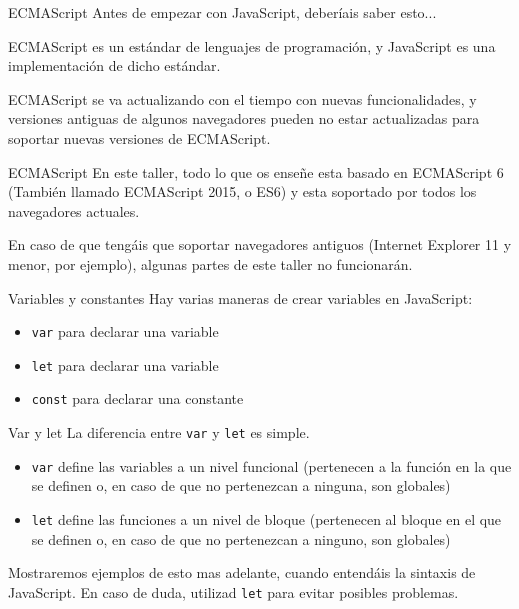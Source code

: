\documentclass{beamer}
\begin{document}
\begin{frame}{ECMAScript}
Antes de empezar con JavaScript, deberíais saber esto...

ECMAScript es un estándar de lenguajes de programación, y JavaScript es una implementación de dicho estándar. \pause

ECMAScript se va actualizando con el tiempo con nuevas funcionalidades, y versiones antiguas de algunos navegadores pueden no estar actualizadas para soportar nuevas versiones de ECMAScript.
\end{frame}

\begin{frame}{ECMAScript}
En este taller, todo lo que os enseñe esta basado en ECMAScript 6 (También llamado ECMAScript 2015, o ES6) y esta soportado por todos los navegadores actuales. \pause

En caso de que tengáis que soportar navegadores antiguos (Internet Explorer 11 y menor, por ejemplo), algunas partes de este taller no funcionarán.
\end{frame}

\begin{frame}[fragile]{Variables y constantes}
Hay varias maneras de crear variables en JavaScript:
\begin{itemize}
    \item {\verb|var|} para declarar una variable \pause
    \item {\verb|let|} para declarar una variable \pause
    \item {\verb|const|} para declarar una constante
\end{itemize}

\end{frame}

\begin{frame}[fragile]{Var y let}
La diferencia entre {\verb|var|} y {\verb|let|} es simple. \pause
\begin{itemize}
    \item {\verb|var|} define las variables a un nivel funcional (pertenecen a la función en la que se definen o, en caso de que no pertenezcan a ninguna, son globales)
    \item {\verb|let|} define las funciones a un nivel de bloque (pertenecen al bloque en el que se definen o, en caso de que no pertenezcan a ninguno, son globales)\pause

\end{itemize}

Mostraremos ejemplos de esto mas adelante, cuando entendáis la sintaxis de JavaScript. En caso de duda, utilizad {\verb|let|} para evitar posibles problemas.
\end{frame}
\end{document}
